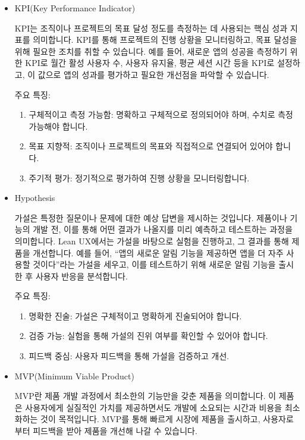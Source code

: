 \documentclass[
  letterpaper,
]{book}
\providecommand{\tightlist}{%
  \setlength{\itemsep}{0pt}\setlength{\parskip}{0pt}}\usepackage{longtable,booktabs,array}
\begin{document}
\begin{itemize}
\item
  KPI(Key Performance Indicator)

  KPI는 조직이나 프로젝트의 목표 달성 정도를 측정하는 데 사용되는 핵심
  성과 지표를 의미합니다. KPI를 통해 프로젝트의 진행 상황을
  모니터링하고, 목표 달성을 위해 필요한 조치를 취할 수 있습니다. 예를
  들어, 새로운 앱의 성공을 측정하기 위한 KPI로 월간 활성 사용자 수,
  사용자 유지율, 평균 세션 시간 등을 KPI로 설정하고, 이 값으로 앱의
  성과를 평가하고 필요한 개선점을 파악할 수 있습니다.

  주요 특징:

  \begin{enumerate}
  \def\labelenumi{\arabic{enumi}.}
  \tightlist
  \item
    구체적이고 측정 가능함: 명확하고 구체적으로 정의되어야 하며, 수치로
    측정 가능해야 합니다.
  \item
    목표 지향적: 조직이나 프로젝트의 목표와 직접적으로 연결되어 있어야
    합니다.
  \item
    주기적 평가: 정기적으로 평가하여 진행 상황을 모니터링합니다.
  \end{enumerate}
\item
  Hypothesis

  가설은 특정한 질문이나 문제에 대한 예상 답변을 제시하는 것입니다.
  제품이나 기능의 개발 전, 이를 통해 어떤 결과가 나올지를 미리 예측하고
  테스트하는 과정을 의미합니다. Lean UX에서는 가설을 바탕으로 실험을
  진행하고, 그 결과를 통해 제품을 개선합니다. 예를 들어, ``앱의 새로운
  알림 기능을 제공하면 앱을 더 자주 사용할 것이다''라는 가설을 세우고,
  이를 테스트하기 위해 새로운 알림 기능을 출시한 후 사용자 반응을
  분석합니다.

  주요 특징:

  \begin{enumerate}
  \def\labelenumi{\arabic{enumi}.}
  \tightlist
  \item
    명확한 진술: 가설은 구체적이고 명확하게 진술되어야 합니다.
  \item
    검증 가능: 실험을 통해 가설의 진위 여부를 확인할 수 있어야 합니다.
  \item
    피드백 중심: 사용자 피드백을 통해 가설을 검증하고 개선.
  \end{enumerate}
\item
  MVP(Minimum Viable Product)

  MVP란 제품 개발 과정에서 최소한의 기능만을 갖춘 제품을 의미합니다. 이
  제품은 사용자에게 실질적인 가치를 제공하면서도 개발에 소요되는 시간과
  비용을 최소화하는 것이 목적입니다. MVP를 통해 빠르게 시장에 제품을
  출시하고, 사용자로부터 피드백을 받아 제품을 개선해 나갈 수 있습니다.


\end{itemize}
\end{document}
